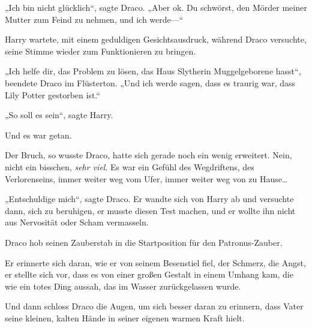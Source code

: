 „Ich bin nicht glücklich“, sagte Draco. „Aber ok. Du schwörst, den Mörder meiner Mutter zum Feind zu nehmen, und ich werde—“

Harry wartete, mit einem geduldigen Gesichtsausdruck, während Draco versuchte, seine Stimme wieder zum Funktionieren zu bringen.

„Ich helfe dir, das Problem zu lösen, das Haus Slytherin Muggelgeborene hasst“, beendete Draco im Flüsterton. „Und ich werde sagen, dass es traurig war, dass Lily Potter gestorben ist.“

„So soll es sein“, sagte Harry.

Und es war getan.

Der Bruch, so wusste Draco, hatte sich gerade noch ein wenig erweitert. Nein, nicht ein bisschen, \emph{sehr viel}. Es war ein Gefühl des Wegdriftens, des Verlorenseins, immer weiter weg vom Ufer, immer weiter weg von zu Hause…

„Entschuldige mich“, sagte Draco. Er wandte sich von Harry ab und versuchte dann, sich zu beruhigen, er musste diesen Test machen, und er wollte ihn nicht aus Nervosität oder Scham vermasseln.

Draco hob seinen Zauberstab in die Startposition für den Patronus-Zauber.

Er erinnerte sich daran, wie er von seinem Besenstiel fiel, der Schmerz, die Angst, er stellte sich vor, dass es von einer großen Gestalt in einem Umhang kam, die wie ein totes Ding aussah, das im Wasser zurückgelassen wurde.

Und dann schloss Draco die Augen, um sich besser daran zu erinnern, dass Vater seine kleinen, kalten Hände in seiner eigenen warmen Kraft hielt.

